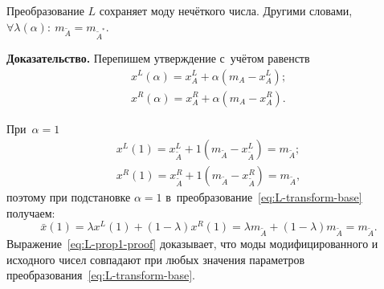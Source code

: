 \begin{prop}
\label{prop:L-prop1}
Преобразование $L$ сохраняет моду нечёткого числа. Другими словами, $\forall \lambda (\alpha ):\ m_{\tilde A}=m_{\tilde A^{*}}$.
\end{prop}
\textbf{Доказательство.} Перепишем утверждение с~учётом равенств
\begin{gather*}
  x^L(\alpha )=x_{A}^{L}+\alpha (m_A-x_{A}^{L}); \\ 
  x^R(\alpha )=x_{A}^{R}+\alpha (m_A-x_{A}^{R}).
\end{gather*}

При~$\alpha=1$ 
\begin{gather*}
  x^L(1)=x_{\tilde A}^{L}+1\left( m_{\tilde A}-x_{\tilde A}^{L} \right)=m_{\tilde A}; \\ 
  x^R(1)=x_{\tilde A}^{R}+1\left( m_{\tilde A}-x_{\tilde A}^{R} \right)=m_{\tilde A},
\end{gather*}
поэтому при подстановке $\alpha=1$ в~преобразование~\eqref{eq:L-transform-base} получаем:
\begin{equation}
\label{eq:L-prop1-proof}
  \bar{x}\left( 1 \right)=\lambda x^L\left( 1 \right)+\left( 1-\lambda  \right)x^R\left( 1 \right)=\lambda m_{\tilde A}+\left( 1-\lambda \right)m_{\tilde A}=m_{\tilde A}.
\end{equation}
Выражение~\eqref{eq:L-prop1-proof} доказывает, что моды модифицированного и исходного чисел совпадают при любых значения параметров преобразования~\eqref{eq:L-transform-base}.

